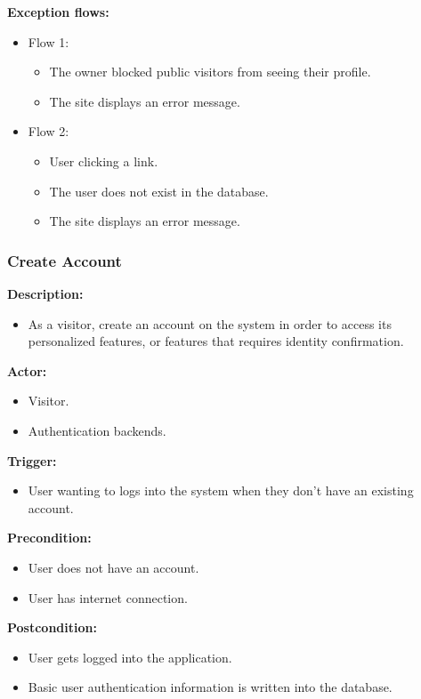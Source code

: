 \documentclass[a4paper]{article}
\begin{document}
\textbf{Exception flows:}
\begin{itemize}
  \item Flow 1:
    \begin{itemize}
      \item The owner blocked public visitors from seeing their profile.
      \item The site displays an error message.
    \end{itemize}
  \item Flow 2:
    \begin{itemize}
      \item User clicking a link.
      \item The user does not exist in the database.
      \item The site displays an error message.
    \end{itemize}
\end{itemize}

\subsubsection{Create Account}
\textbf{Description:}
\begin{itemize}
  \item As a visitor, create an account on the system in order to access its personalized features, or features that requires identity confirmation.
\end{itemize}

\textbf{Actor:}
\begin{itemize}
  \item Visitor.
  \item Authentication backends.
\end{itemize}

\textbf{Trigger:}
\begin{itemize}
  \item User wanting to logs into the system when they don't have an existing account.
\end{itemize}

\textbf{Precondition:}
\begin{itemize}
  \item User does not have an account.
  \item User has internet connection.
\end{itemize}

\textbf{Postcondition:}
\begin{itemize}
  \item User gets logged into the application.
  \item Basic user authentication information is written into the database.
\end{itemize}
\end{document}
